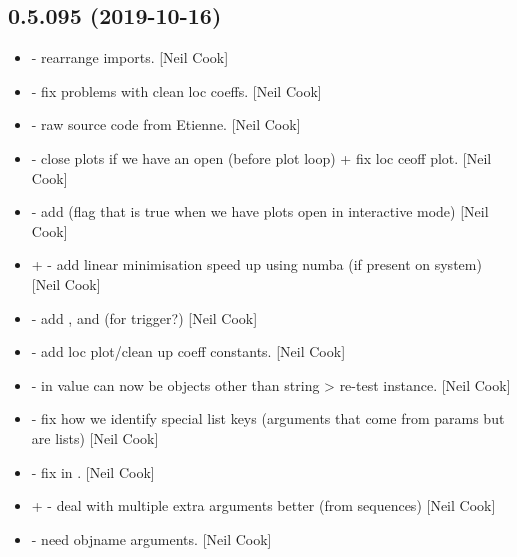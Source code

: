 \documentclass[a4paper,10pt,english]{report}
\begin{document}
\subsection{0.5.095 (2019-10-16)}
\label{\detokenize{misc/changelog:id47}}\begin{itemize}
\item {} 
 - rearrange imports. {[}Neil Cook{]}

\item {} 
 - fix problems with clean loc coeffs.
{[}Neil Cook{]}

\item {} 
 - raw source code from Etienne. {[}Neil Cook{]}

\item {} 
 - close plots if we have an open (before
plot loop) + fix loc ceoff plot. {[}Neil Cook{]}

\item {} 
 - add  (flag that is true when we have
plots open in interactive mode) {[}Neil Cook{]}

\item {} 
 +  - add linear minimisation speed up
using numba (if present on system) {[}Neil Cook{]}

\item {} 
 - add ,
 and  (for trigger?) {[}Neil Cook{]}

\item {} 
 - add loc plot/clean up coeff
constants. {[}Neil Cook{]}

\item {} 
 - in  value can now be objects other
than string \textendash{}\textgreater{} re-test instance. {[}Neil Cook{]}

\item {} 
 - fix how we identify special list keys
(arguments that come from params but are lists) {[}Neil Cook{]}

\item {} 
 - fix  in . {[}Neil Cook{]}

\item {} 
 +  - deal
with multiple extra arguments better (from sequences) {[}Neil Cook{]}

\item {} 
 -  need
objname arguments. {[}Neil Cook{]}

\end{itemize}
\end{document}

